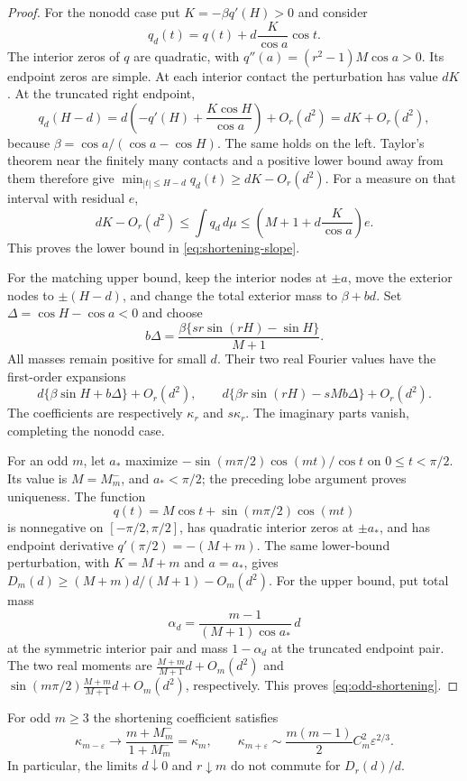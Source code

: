 \begin{proof}
For the nonodd case put $K=-\beta q'(H)>0$ and consider
\[
 q_d(t)=q(t)+d\frac{K}{\cos a}\cos t.
\]
The interior zeros of $q$ are quadratic, with
$q''(a)=(r^2-1)M\cos a>0$. Its endpoint zeros are simple. At each
interior contact the perturbation has value $dK$. At the truncated
right endpoint,
\[
 q_d(H-d)
   =d\left(-q'(H)+\frac{K\cos H}{\cos a}\right)+O_r(d^2)
   =dK+O_r(d^2),
\]
because $\beta=\cos a/(\cos a-\cos H)$. The same holds on the left.
Taylor's theorem near the finitely many contacts and a positive lower
bound away from them therefore give
$\min_{|t|\le H-d}q_d(t)\ge dK-O_r(d^2)$.
For a measure on that interval with residual $e$,
\[
 dK-O_r(d^2)\le\int q_d\,d\mu
       \le\left(M+1+d\frac{K}{\cos a}\right)e.
\]
This proves the lower bound in \eqref{eq:shortening-slope}.

For the matching upper bound, keep the interior nodes at $\pm a$,
move the exterior nodes to $\pm(H-d)$, and change the total exterior
mass to $\beta+bd$. Set $\Delta=\cos H-\cos a<0$ and choose
\[
 b\Delta=\frac{\beta\{sr\sin(rH)-\sin H\}}{M+1}.
\]
All masses remain positive for small $d$. Their two real Fourier
values have the first-order expansions
\[
 d\{\beta\sin H+b\Delta\}+O_r(d^2),\qquad
 d\{\beta r\sin(rH)-sMb\Delta\}+O_r(d^2).
\]
The coefficients are respectively $\kappa_r$ and $s\kappa_r$.
The imaginary parts vanish, completing the nonodd case.

For an odd $m$, let $a_*$ maximize
$-\sin(m\pi/2)\cos(mt)/\cos t$ on $0\le t<\pi/2$.
Its value is $M=M_m^-$, and $a_*<\pi/2$; the preceding lobe argument
proves uniqueness. The function
\[
 q(t)=M\cos t+\sin(m\pi/2)\cos(mt)
\]
is nonnegative on $[-\pi/2,\pi/2]$, has quadratic interior zeros at
$\pm a_*$, and has endpoint derivative $q'(\pi/2)=-(M+m)$.
The same lower-bound perturbation, with $K=M+m$ and $a=a_*$, gives
$D_m(d)\ge (M+m)d/(M+1)-O_m(d^2)$.
For the upper bound, put total mass
\[
 \alpha_d=\frac{m-1}{(M+1)\cos a_*}\,d
\]
at the symmetric interior pair and mass $1-\alpha_d$ at the truncated
endpoint pair. The two real moments are
$\frac{M+m}{M+1}d+O_m(d^2)$ and
$\sin(m\pi/2)\frac{M+m}{M+1}d+O_m(d^2)$, respectively.
This proves \eqref{eq:odd-shortening}.
\end{proof}

\begin{corollary}
For odd $m\ge3$ the shortening coefficient satisfies
\[
 \kappa_{m-\varepsilon}\longrightarrow
       \frac{m+M_m^-}{1+M_m^-}=\kappa_m,
 \qquad
 \kappa_{m+\varepsilon}\sim
       \frac{m(m-1)}2C_m^2\varepsilon^{2/3}.
\]
In particular, the limits $d\downarrow0$ and $r\downarrow m$ do not
commute for $D_r(d)/d$.
\end{corollary}

